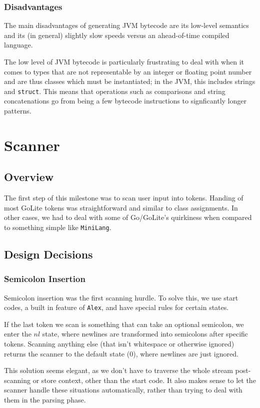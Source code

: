\documentclass[11pt]{article}
\begin{document}
\subsubsection{Disadvantages}
The main disadvantages of generating JVM bytecode are its low-level
semantics and its (in general) slightly slow speeds versus an
ahead-of-time compiled language.

The low level of JVM bytecode is particularly frustrating to deal with
when it comes to types that are not representable by an integer or
floating point number and are thus classes which must be instantiated;
in the JVM, this includes strings and \texttt{struct}. This means that operations
such as comparisons and string concatenations go from being a few
bytecode instructions to signficantly longer patterns.
\section{Scanner}
\subsection{Overview}
The first step of this milestone was to scan user input into
tokens. Handing of most GoLite tokens was straightforward and similar
to class assignments. In other cases, we had to deal with some of
Go/GoLite's quirkiness when compared to something simple like
\texttt{MiniLang}.

\subsection{Design Decisions}
\subsubsection{Semicolon Insertion}
Semicolon insertion was the first scanning hurdle. To solve this, we
use start codes, a built in feature of \texttt{Alex}, and have special
rules for certain states.

If the last token we scan is something that can take an optional
semicolon, we enter the \(nl\) state, where newlines are transformed
into semicolons after specific tokens. Scanning anything else (that
isn't whitespace or otherwise ignored) returns the scanner to the
default state (\(0\)), where newlines are just ignored.

This solution seems elegant, as we don't have to traverse the whole
stream post-scanning or store context, other than the start code. It
also makes sense to let the scanner handle these situations
automatically, rather than trying to deal with them in the parsing
phase.
\end{document}

